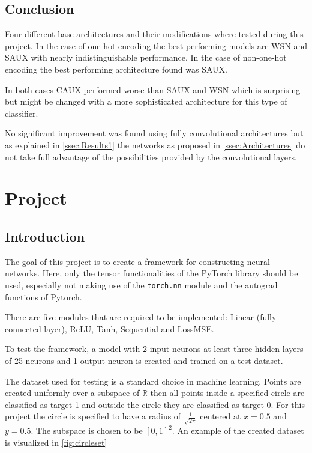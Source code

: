 \documentclass[11pt,english]{article}
\begin{document}
	\subsection{Conclusion}
	Four different base architectures and their modifications where tested during this project. In the case of one-hot encoding the best performing models are WSN and SAUX with nearly indistinguishable performance. In the case of non-one-hot encoding the best performing architecture found was SAUX. 
	
	In both cases CAUX performed worse than SAUX and WSN which is surprising but might be changed with a more sophisticated architecture for this type of classifier.
	
	No significant improvement was found using fully convolutional architectures but as explained in \cref{ssec:Results1} the networks as proposed in \cref{ssec:Architectures} do not take full advantage of the possibilities provided by the convolutional layers.

	\section{Project} \label{sec:Proj2}
	\vspace{-10pt}
	
	\subsection{Introduction} \label{ssec:Intro2}
	The goal of this project is to create a framework for constructing neural networks. Here, only the tensor functionalities of the PyTorch library should be used, especially not making use of the \lstinline|torch.nn| module and the autograd functions of Pytorch.
	
	There are five modules that are required to be implemented: Linear (fully connected layer), ReLU, Tanh, Sequential and LossMSE.
	
	To test the framework, a model with 2 input neurons at least three hidden layers of 25 neurons and 1 output neuron is created and trained on a test dataset. 
	
	The dataset used for testing is a standard choice in machine learning. Points are created uniformly over a subspace of $\mathbb{R}$ then all points inside a specified circle are classified as target 1 and outside the circle they are classified as target 0. For this project the circle is specified to have a radius of $\frac{1}{\sqrt{2 \pi}}$ centered at $x=0.5$ and $y=0.5$. The subspace is chosen to be $[0, 1]^2$. An example of the created dataset is visualized in \cref{fig:circleset}
	
\end{document}
